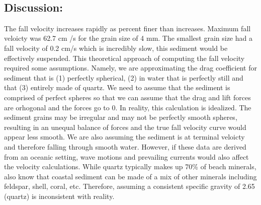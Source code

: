 \documentclass[11pt]{article}
\begin{document}
    \begin{center}
    \end{center}
    { \hspace*{\fill} \\}
    
    \hypertarget{discussion}{%
\subsection{Discussion:}\label{discussion}}

The fall velocity increases rapidly as percent finer than increases.
Maximum fall veloicty was 62.7 cm /s for the grain size of 4 mm. The
smallest grain size had a fall velocity of 0.2 cm/s which is incredibly
slow, this sediment would be effectively suspended. This theoretical
approach of computing the fall velocity required some assumptions.
Namely, we are approximating the drag coefficient for sediment that is
(1) perfectly spherical, (2) in water that is perfectly still and that
(3) entirely made of quartz. We need to assume that the sediment is
comprised of perfect spheres so that we can assume that the drag and
lift forces are orhogonal and the forces go to 0. In reality, this
calculation is idealized. The sediment grains may be irregular and may
not be perfectly smooth spheres, resulting in an unequal balance of
forces and the true fall velocity curve would appear less smooth. We are
also assuming the sediment is at terminal veloicty and therefore falling
through smooth water. However, if these data are derived from an oceanic
setting, wave motions and prevailing currents would also affect the
velocity calculations. While quartz typically makes up 70\% of beach
minerals, also know that coastal sediment can be made of a mix of other
minerals including feldspar, shell, coral, etc. Therefore, assuming a
consistent specific gravity of 2.65 (quartz) is inconsistent with
reality.


    
    
    
    
\end{document}
